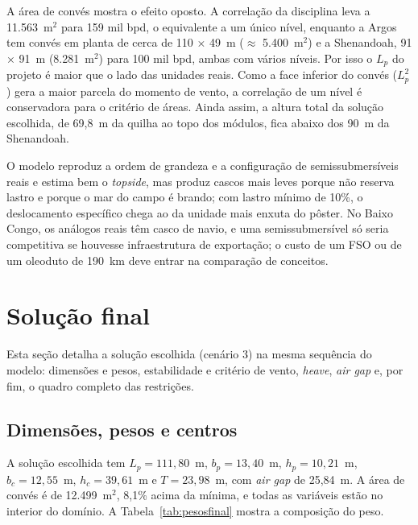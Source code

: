 \documentclass[11pt,a4paper]{article}
\begin{document}
A área de convés mostra o efeito oposto. A correlação da disciplina leva a 11.563~m$^2$ para 159 mil
bpd, o equivalente a um único nível, enquanto a Argos tem convés em planta de cerca de 110 × 49~m
($\approx$ 5.400~m$^2$) e a Shenandoah, 91 × 91~m (8.281~m$^2$) para 100 mil bpd, ambas com vários
níveis. Por isso o $L_p$ do projeto é maior que o lado das unidades reais. Como a face inferior do
convés ($L_p^2$) gera a maior parcela do momento de vento, a correlação de um nível é conservadora
para o critério de áreas. Ainda assim, a altura total da solução escolhida, de 69,8~m da quilha ao
topo dos módulos, fica abaixo dos 90~m da Shenandoah.

\begin{sintese}
O modelo reproduz a ordem de grandeza e a configuração de semissubmersíveis reais e estima bem o
\emph{topside}, mas produz cascos mais leves porque não reserva lastro e porque o mar do campo é
brando; com lastro mínimo de 10\%, o deslocamento específico chega ao da unidade mais enxuta do
pôster. No Baixo Congo, os análogos reais têm casco de navio, e uma semissubmersível só seria
competitiva se houvesse infraestrutura de exportação; o custo de um FSO ou de um oleoduto de
190~km deve entrar na comparação de conceitos.
\end{sintese}


\section{Solução final}\label{sec:final}

Esta seção detalha a solução escolhida (cenário 3) na mesma sequência do modelo: dimensões e pesos,
estabilidade e critério de vento, \emph{heave}, \emph{air gap} e, por fim, o quadro completo das
restrições.

\subsection{Dimensões, pesos e centros}

A solução escolhida tem $L_p = 111{,}80$~m, $b_p = 13{,}40$~m, $h_p = 10{,}21$~m, $b_c = 12{,}55$~m,
$h_c = 39{,}61$~m e $T = 23{,}98$~m, com \emph{air gap} de 25,84~m. A área de convés é de
12.499~m$^2$, 8,1\% acima da mínima, e todas as variáveis estão no interior do domínio. A
Tabela~\ref{tab:pesosfinal} mostra a composição do peso.
\end{document}
